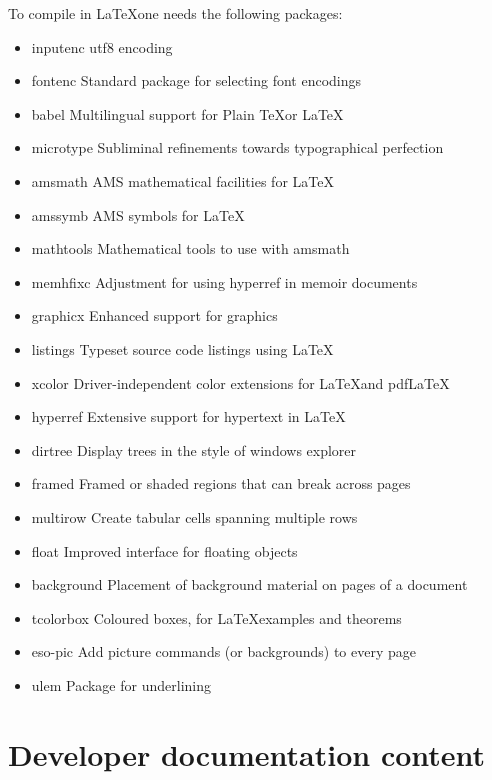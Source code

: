 To compile in \LaTeX one needs the following packages:
\begin{itemize}
	\item inputenc \dotfill utf8 encoding
	\item fontenc \dotfill Standard package for selecting font encodings
	\item babel \dotfill Multilingual support for Plain \TeX or \LaTeX
	\item microtype \dotfill Sublim­i­nal re­fine­ments to­wards ty­po­graph­i­cal per­fec­tion
	\item amsmath \dotfill AMS mathematical facilities for \LaTeX
	\item amssymb \dotfill AMS symbols for \LaTeX
	\item mathtools \dotfill Mathematical tools to use with amsmath
	\item memhfixc \dotfill Adjustment for using hyperref in memoir documents
	\item graphicx \dotfill Enhanced support for graphics
	\item listings \dotfill Typeset source code listings using \LaTeX
	\item xcolor \dotfill Driver-independent color extensions for \LaTeX and pdf\LaTeX
	\item hyperref \dotfill Extensive support for hypertext in \LaTeX
	\item dirtree \dotfill Display trees in the style of windows explorer
	\item framed \dotfill Framed or shaded regions that can break across pages
	\item multirow \dotfill Create tabular cells spanning multiple rows
	\item float \dotfill Improved interface for floating objects
	\item background \dotfill Placement of background material on pages of a document
	\item tcolorbox \dotfill Coloured boxes, for \LaTeX examples and theorems
	\item eso-pic \dotfill Add picture commands (or backgrounds) to every page
	\item ulem \dotfill Package for underlining
\end{itemize}


\section{Developer documentation content}
\label{ch:documentation:devguide}

